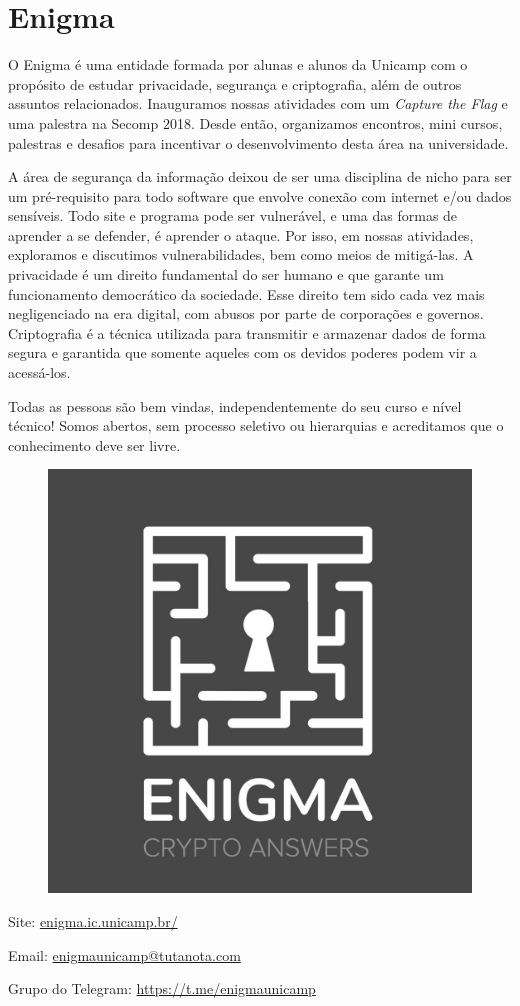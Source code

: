
\section{Enigma}

O Enigma é uma entidade formada por alunas e alunos da Unicamp com o propósito
de estudar privacidade, segurança e criptografia, além de outros assuntos
relacionados. Inauguramos nossas atividades com um \textit{Capture the Flag} e
uma palestra na Secomp 2018. Desde então, organizamos encontros, mini cursos,
palestras e desafios para incentivar o desenvolvimento desta área na
universidade.

A área de segurança da informação deixou de ser uma disciplina de nicho para
ser um pré-requisito para todo software que envolve conexão com internet e/ou
dados sensíveis. Todo site e programa pode ser vulnerável, e uma das formas de
aprender a se defender, é aprender o ataque. Por isso, em nossas atividades,
exploramos e discutimos vulnerabilidades, bem como meios de mitigá-las. A
privacidade é um direito fundamental do ser humano e que garante um
funcionamento democrático da sociedade. Esse direito tem sido cada vez mais
negligenciado na era digital, com abusos por parte de corporações e governos.
Criptografia é a técnica utilizada para transmitir e armazenar dados de forma
segura e garantida que somente aqueles com os devidos poderes podem vir a
acessá-los.

Todas as pessoas são bem vindas, independentemente do seu curso e nível
técnico! Somos abertos, sem processo seletivo ou hierarquias e acreditamos que
o conhecimento deve ser livre.

\begin{figure}[H]
  \centering
  \includegraphics[width=.24\textwidth]
  {img/alem_da_graduacao/enigma_logo.jpg}
\end{figure}


\begin{compactitemize}
\item Site: \url{enigma.ic.unicamp.br/}
\item Email: \url{enigmaunicamp@tutanota.com}
\item Grupo do Telegram: \url{https://t.me/enigmaunicamp}
\end{compactitemize}
